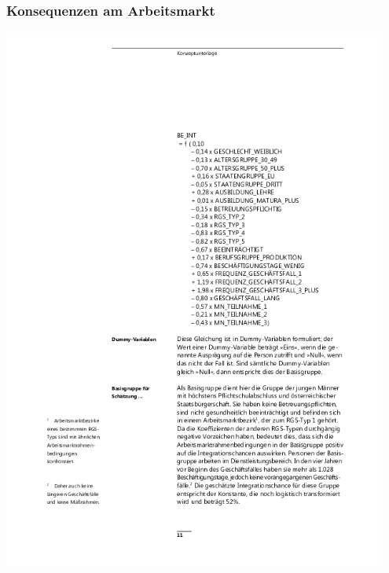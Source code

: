 \documentclass[aspectratio=43,x11names]{beamer}
\begin{document}
\begin{frame}
\frametitle{Konsequenzen am Arbeitsmarkt}
\begin{minipage}{.5\textwidth}
\includegraphics[width=0.95\textwidth, keepaspectratio]{images/negativfaktor}
\end{minipage}\begin{minipage}{.5\textwidth}

\end{minipage}
\end{frame}
\end{document}
